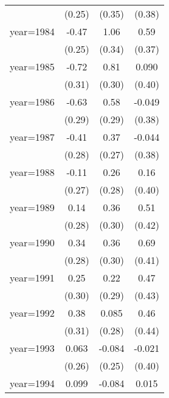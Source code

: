 \begin{sidewaystable}[htbp]
\begin{tabular}{l*{3}{c}}
                &   (0.25)         &   (0.35)         &   (0.38)         \\
\addlinespace
year=1984       &    -0.47\sym{*}  &     1.06\sym{***}&     0.59         \\
                &   (0.25)         &   (0.34)         &   (0.37)         \\
\addlinespace
year=1985       &    -0.72\sym{**} &     0.81\sym{**} &    0.090         \\
                &   (0.31)         &   (0.30)         &   (0.40)         \\
\addlinespace
year=1986       &    -0.63\sym{**} &     0.58\sym{*}  &   -0.049         \\
                &   (0.29)         &   (0.29)         &   (0.38)         \\
\addlinespace
year=1987       &    -0.41         &     0.37         &   -0.044         \\
                &   (0.28)         &   (0.27)         &   (0.38)         \\
\addlinespace
year=1988       &    -0.11         &     0.26         &     0.16         \\
                &   (0.27)         &   (0.28)         &   (0.40)         \\
\addlinespace
year=1989       &     0.14         &     0.36         &     0.51         \\
                &   (0.28)         &   (0.30)         &   (0.42)         \\
\addlinespace
year=1990       &     0.34         &     0.36         &     0.69\sym{*}  \\
                &   (0.28)         &   (0.30)         &   (0.41)         \\
\addlinespace
year=1991       &     0.25         &     0.22         &     0.47         \\
                &   (0.30)         &   (0.29)         &   (0.43)         \\
\addlinespace
year=1992       &     0.38         &    0.085         &     0.46         \\
                &   (0.31)         &   (0.28)         &   (0.44)         \\
\addlinespace
year=1993       &    0.063         &   -0.084         &   -0.021         \\
                &   (0.26)         &   (0.25)         &   (0.40)         \\
\addlinespace
year=1994       &    0.099         &   -0.084         &    0.015         \\

\end{tabular}
\end{sidewaystable}
